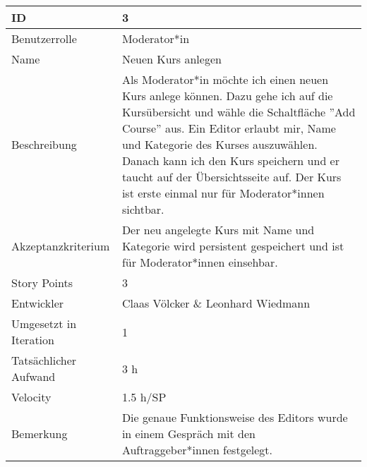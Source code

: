 \begin{tabularx}{\textwidth}{|p{}|X|}
	\hline
	ID & 3\\
	\hline
	Benutzerrolle & Moderator*in\\
	\hline
	Name & Neuen Kurs anlegen\\
	\hline
	Beschreibung & Als Moderator*in möchte ich einen neuen Kurs anlege können. Dazu gehe ich auf die Kursübersicht und wähle die Schaltfläche ''Add Course'' aus. Ein Editor erlaubt mir, Name und Kategorie des Kurses auszuwählen. Danach kann ich den Kurs speichern und er taucht auf der Übersichtsseite auf. Der Kurs ist erste einmal nur für Moderator*innen sichtbar.
\\
	\hline
	Akzeptanzkriterium & Der neu angelegte Kurs mit Name und Kategorie wird persistent gespeichert und ist für Moderator*innen einsehbar.\\
	\hline
	Story Points & 3\\
	\hline
	Entwickler & Claas Völcker \& Leonhard Wiedmann\\
	\hline
	Umgesetzt in Iteration & 1\\
	\hline
	Tatsächlicher Aufwand & 3 h\\
	\hline
	Velocity & 1.5 h/SP\\
	\hline
	Bemerkung & Die genaue Funktionsweise des Editors wurde in einem Gespräch mit den Auftraggeber*innen festgelegt.\\
	\hline
\end{tabularx}
\vspace{20pt}
